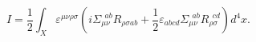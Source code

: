 \begin{equation}
I=\frac{1}{2}\int_X \varepsilon^{\mu\nu\rho\sigma}\left(i\Sigma_{\mu\nu}^{\ \ ab}R_{\rho \sigma ab}+
\frac{1}{2}\varepsilon_{abcd}\Sigma_{\mu\nu}^{\ \ ab}R_{\rho \sigma}^{\ \ cd}\right)d^4x.
\end{equation}

